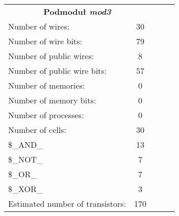 \begin{table}[!htb]
	\begin{minipage}{0.55\linewidth}
		\centering
		\begin{tabular}{lllll}
			\cline{1-2}
			\multicolumn{2}{|c|}{\textbf{Podmoduł \emph{mod3}}} &  &  &  \\ \cline{1-2}
			\multicolumn{1}{|l|}{Number of wires:} & \multicolumn{1}{c|}{30} &  &  &  \\ \cline{1-2}
			\multicolumn{1}{|l|}{Number of wire bits:} & \multicolumn{1}{c|}{79} &  &  &  \\ \cline{1-2}
			\multicolumn{1}{|l|}{Number of public wires:} & \multicolumn{1}{c|}{8} &  &  &  \\ \cline{1-2}
			\multicolumn{1}{|l|}{Number of public wire bits:} & \multicolumn{1}{c|}{57} &  &  &  \\ \cline{1-2}
			\multicolumn{1}{|l|}{Number of memories:} & \multicolumn{1}{c|}{0} &  &  &  \\ \cline{1-2}
			\multicolumn{1}{|l|}{Number of memory bits: } & \multicolumn{1}{c|}{0} &  &  &  \\ \cline{1-2}
			\multicolumn{1}{|l|}{Number of processes: } & \multicolumn{1}{c|}{0} &  &  &  \\ \cline{1-2}
			\multicolumn{1}{|l|}{Number of cells:} & \multicolumn{1}{c|}{30} &  &  &  \\ \cline{1-2}
			\multicolumn{1}{|l|}{\$\_AND\_} & \multicolumn{1}{c|}{13} &  &  &  \\ \cline{1-2}
			\multicolumn{1}{|l|}{\$\_NOT\_} & \multicolumn{1}{c|}{7} &  &  &  \\ \cline{1-2}
			\multicolumn{1}{|l|}{\$\_OR\_} & \multicolumn{1}{c|}{7} &  &  &  \\ \cline{1-2}
			\multicolumn{1}{|l|}{\$\_XOR\_} & \multicolumn{1}{c|}{3} &  &  &  \\ \cline{1-2}
			\multicolumn{1}{|l|}{Estimated number of transistors:} & \multicolumn{1}{c|}{170} &  &  &  \\ \cline{1-2}
			

\end{tabular}
\end{minipage}
\end{table}
